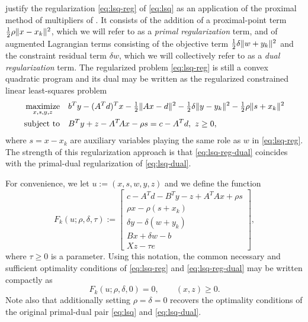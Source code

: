 \documentclass{amsart}
\begin{document}
\cite{friedlander-orban-2012} justify the regularization \eqref{eq:lsq-reg} of
\eqref{eq:lsq} as an application of the proximal method of multipliers of
\cite{rockafellar-1976}. It consists of the addition of a proximal-point term
$\tfrac{1}{2} \rho \|x - x_k\|^2$,  which we will refer to as a \textit{primal
regularization} term, and of augmented Lagrangian terms consisting of the
objective term $\tfrac{1}{2} \delta \|w + y_k\|^2$ and the constraint
residual term $\delta w$,   which we will collectively refer to as a \textit{dual
regularization} term. The regularized problem \eqref{eq:lsq-reg} is still a
convex quadratic program and its dual may be written as the regularized
constrained linear least-squares problem
\begin{equation}
  \label{eq:lsq-reg-dual}
  \begin{aligned}
    \displaystyle\mathop{\textup{maximize}}_{x, s, y, z} \quad &
    b^T y - (A^T d)^T x - \tfrac{1}{2} \|Ax - d\|^2 -
    \tfrac{1}{2} \delta \|y - y_k\|^2 - \tfrac{1}{2} \rho \|s + x_k\|^2 \\
    \mathop{\textup{subject to}} \quad & B^T y + z - A^T \! A x - \rho s = c - A^T d, \ z \geq 0,
  \end{aligned}
\end{equation}
where $s = x - x_k$ are auxiliary variables playing the same role as $w$ in
\eqref{eq:lsq-reg}. The strength of this regularization approach is that
\eqref{eq:lsq-reg-dual} coincides with the primal-dual regularization of
\eqref{eq:lsq-dual}.

For convenience, we let $u := (x, s, w, y, z)$ and we define the function
\begin{equation}
  \label{eq:def-F}
  F_k(u; \rho, \delta, \tau) :=
  \begin{bmatrix}
    c - A^T d - B^T y - z + A^T \! A x + \rho s \\
    \rho x - \rho (s + x_k) \\
    \delta y - \delta (w + y_k) \\
    Bx + \delta w - b \\
    X z - \tau e
  \end{bmatrix},
\end{equation}
where $\tau \geq 0$ is a parameter. Using this notation, the common necessary
and sufficient optimality conditions of \eqref{eq:lsq-reg} and
\eqref{eq:lsq-reg-dual} may be written compactly as
\[
  F_k(u; \rho, \delta, 0) = 0,
  \qquad
  (x, z) \geq 0.
\]
Note also that additionally setting  $\rho = \delta = 0$ recovers the optimality
conditions of the original primal-dual pair \eqref{eq:lsq} and
\eqref{eq:lsq-dual}.
\end{document}

